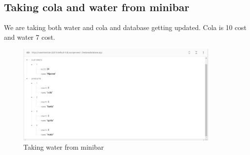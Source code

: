\subsection{Taking cola and water from minibar}
We are taking both water and cola and database getting updated. Cola is 10 cost and water 7 cost.
\begin{figure}[!htbp]
    \centering
    \includegraphics[width=0.9\textwidth]{Imgs/taking cola and water in same time.PNG}
    \caption{\label{fig:taking products from minibar}Taking water from minibar}
\end{figure}



